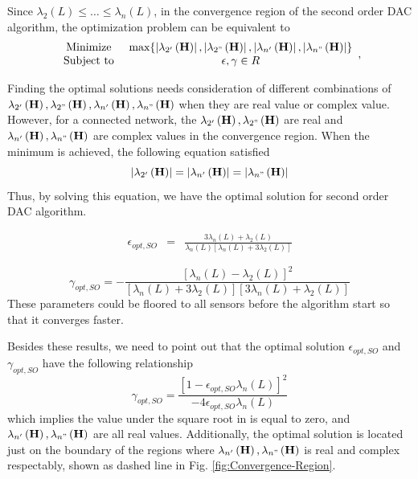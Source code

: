 Since $\lambda_{2}\left(L\right)\leq\dots\leq\lambda_{n}\left(L\right)$,
in the convergence region of the second order DAC algorithm, the optimization
problem  can be equivalent to 
\[
\begin{array}{cc}
\mbox{Minimize } & \mbox{max}\{\left|\lambda_{2'}\left(\mathbf{H}\right)\right|,\left|\lambda_{2"}\left(\mathbf{H}\right)\right|,\left|\lambda_{n'}\left(\mathbf{H}\right)\right|,\left|\lambda_{n"}\left(\mathbf{H}\right)\right|\}\\
\mbox{Subject to } & \epsilon,\gamma\in R
\end{array},
\]


Finding the optimal solutions needs consideration of different combinations
of $\lambda_{2'}\left(\mathbf{H}\right),\lambda_{2"}\left(\mathbf{H}\right),\lambda_{n'}\left(\mathbf{H}\right),\lambda_{n"}\left(\mathbf{H}\right)$
when they are real value or complex value. However, for a connected
network, the $\lambda_{2'}\left(\mathbf{H}\right),\lambda_{2"}\left(\mathbf{H}\right)$
are real and $\lambda_{n'}\left(\mathbf{H}\right),\lambda_{n"}\left(\mathbf{H}\right)$
are complex values in the convergence region. When the minimum is
achieved, the following equation satisfied
\[
\left|\lambda_{2'}\left(\mathbf{H}\right)\right|=\left|\lambda_{n'}\left(\mathbf{H}\right)\right|=\left|\lambda_{n"}\left(\mathbf{H}\right)\right|
\]
Thus, by solving this equation, we have the optimal solution for second
order DAC algorithm.

\begin{eqnarray}
\epsilon{}_{opt,SO} & = & \frac{3\lambda_{n}(L)+\lambda_{2}(L)}{\lambda_{n}(L)\left[\lambda_{n}(L)+3\lambda_{2}(L)\right]}
\end{eqnarray}


\begin{equation}
\gamma_{opt,SO}=-\frac{\left[\lambda_{n}(L)-\lambda_{2}(L)\right]^{2}}{\left[\lambda_{n}(L)+3\lambda_{2}(L)\right]\left[3\lambda_{n}(L)+\lambda_{2}(L)\right]}
\end{equation}
These parameters could be floored to all sensors before the algorithm
start so that it converges faster.

Besides these results, we need to point out that the optimal solution
$\epsilon{}_{opt,SO}$ and $\gamma_{opt,SO}$ have the following relationship
\[
\gamma_{opt,SO}=\frac{\left[1-\epsilon{}_{opt,SO}\lambda_{n}\left(L\right)\right]^{2}}{-4\epsilon{}_{opt,SO}\lambda_{n}\left(L\right)}
\]
which implies the value under the square root in 
is equal to zero, and $\lambda_{n'}\left(\mathbf{H}\right),\lambda_{n"}\left(\mathbf{H}\right)$
are all real values. Additionally, the optimal solution is located
just on the boundary of the regions where $\lambda_{n'}\left(\mathbf{H}\right),\lambda_{n"}\left(\mathbf{H}\right)$
is real and complex respectably, shown as dashed line in Fig. \ref{fig:Convergence-Region}. 



